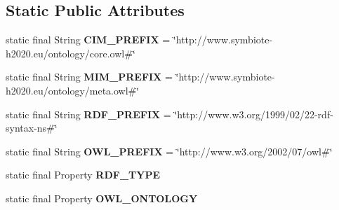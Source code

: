 \subsection*{Static Public Attributes}
\begin{DoxyCompactItemize}
\item 
static final String {\bfseries C\+I\+M\+\_\+\+P\+R\+E\+F\+IX} = \char`\"{}http\+://www.\+symbiote-\/h2020.\+eu/ontology/core.\+owl\#\char`\"{}\hypertarget{classeu_1_1h2020_1_1symbiote_1_1ontology_1_1model_1_1MetaInformationModel_aa32f19cf912220fe4aca85bee1e8e1d5}{}\label{classeu_1_1h2020_1_1symbiote_1_1ontology_1_1model_1_1MetaInformationModel_aa32f19cf912220fe4aca85bee1e8e1d5}

\item 
static final String {\bfseries M\+I\+M\+\_\+\+P\+R\+E\+F\+IX} = \char`\"{}http\+://www.\+symbiote-\/h2020.\+eu/ontology/meta.\+owl\#\char`\"{}\hypertarget{classeu_1_1h2020_1_1symbiote_1_1ontology_1_1model_1_1MetaInformationModel_a1c8d4b2941c9eadf86b8bcd94d8eda98}{}\label{classeu_1_1h2020_1_1symbiote_1_1ontology_1_1model_1_1MetaInformationModel_a1c8d4b2941c9eadf86b8bcd94d8eda98}

\item 
static final String {\bfseries R\+D\+F\+\_\+\+P\+R\+E\+F\+IX} = \char`\"{}http\+://www.\+w3.\+org/1999/02/22-\/rdf-\/syntax-\/ns\#\char`\"{}\hypertarget{classeu_1_1h2020_1_1symbiote_1_1ontology_1_1model_1_1MetaInformationModel_ab2d07537b5a6830848375bb500eb326b}{}\label{classeu_1_1h2020_1_1symbiote_1_1ontology_1_1model_1_1MetaInformationModel_ab2d07537b5a6830848375bb500eb326b}

\item 
static final String {\bfseries O\+W\+L\+\_\+\+P\+R\+E\+F\+IX} = \char`\"{}http\+://www.\+w3.\+org/2002/07/owl\#\char`\"{}\hypertarget{classeu_1_1h2020_1_1symbiote_1_1ontology_1_1model_1_1MetaInformationModel_a6f74590fdfe17ddf38e81755e0f00731}{}\label{classeu_1_1h2020_1_1symbiote_1_1ontology_1_1model_1_1MetaInformationModel_a6f74590fdfe17ddf38e81755e0f00731}

\item 
static final Property {\bfseries R\+D\+F\+\_\+\+T\+Y\+PE}\hypertarget{classeu_1_1h2020_1_1symbiote_1_1ontology_1_1model_1_1MetaInformationModel_a31dd64c5c10e76fc7b05ec7c38ed8e7b}{}\label{classeu_1_1h2020_1_1symbiote_1_1ontology_1_1model_1_1MetaInformationModel_a31dd64c5c10e76fc7b05ec7c38ed8e7b}

\item 
static final Property {\bfseries O\+W\+L\+\_\+\+O\+N\+T\+O\+L\+O\+GY}\hypertarget{classeu_1_1h2020_1_1symbiote_1_1ontology_1_1model_1_1MetaInformationModel_a223b843d1075d644d50bd9e11873a4b8}{}\label{classeu_1_1h2020_1_1symbiote_1_1ontology_1_1model_1_1MetaInformationModel_a223b843d1075d644d50bd9e11873a4b8}


\end{DoxyCompactItemize}
